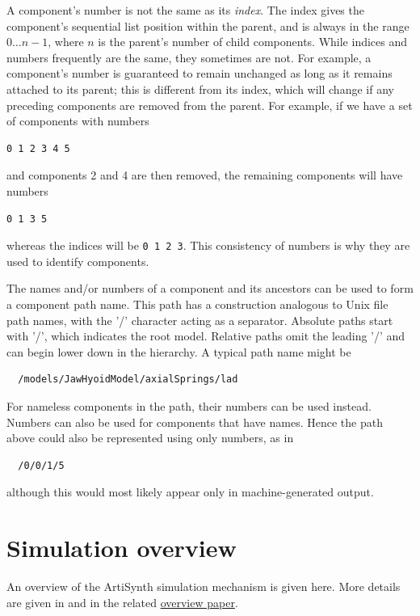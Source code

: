 \begin{sideblock}
A component's number is not the same as its {\it index}.  The index
gives the component's sequential list position within the parent, and
is always in the range $0 \ldots n-1$, where $n$ is the parent's
number of child components. While indices and numbers frequently are
the same, they sometimes are not. For example, a component's number is
guaranteed to remain unchanged as long as it remains attached to its
parent; this is different from its index, which will change if any
preceding components are removed from the parent. For example, if we
have a set of components with numbers
%
\begin{verbatim}
0 1 2 3 4 5
\end{verbatim}
%
and components 2 and 4 are then removed, the remaining components will
have numbers
%
\begin{verbatim}
0 1 3 5
\end{verbatim}
%
whereas the indices will be {\tt 0 1 2 3}. This consistency of
numbers is why they are used to identify components.
\end{sideblock}

The names and/or numbers of a component and its ancestors can be used to form a
component path name. This path has a construction analogous to Unix file path
names, with the '/' character acting as a separator. Absolute paths start with
'/', which indicates the root model. Relative paths omit the leading '/' and
can begin lower down in the hierarchy. A typical path name might be
\begin{verbatim}
  /models/JawHyoidModel/axialSprings/lad
\end{verbatim}
For nameless components in the path, their numbers can be used
instead.  Numbers can also be used for components that have
names. Hence the path above could also be represented using
only numbers, as in
\begin{verbatim}
  /0/0/1/5
\end{verbatim}
although this would most likely appear only in machine-generated
output.

\section{Simulation overview}

An overview of the ArtiSynth simulation mechanism is given here.  More
details are given in \cite{lloyd2012artisynth} and in the related
\href{http://www.artisynth.org/doc/artisynth.pdf}{overview paper}.

